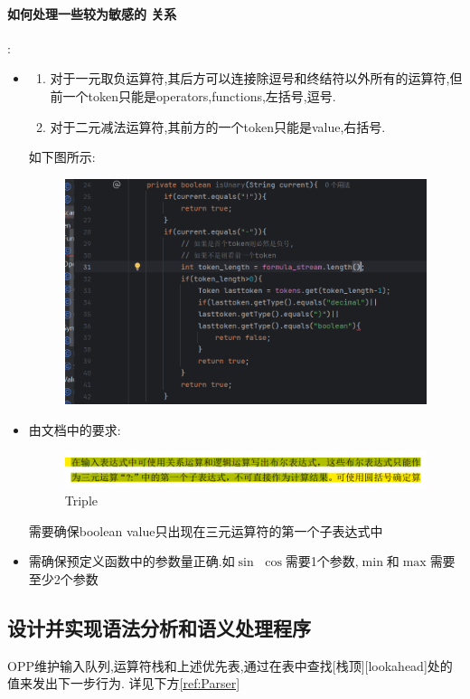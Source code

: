 \documentclass{article}
\begin{document}
\paragraph{如何处理一些较为敏感的 关系}:
\begin{itemize}
    \item {}
          \begin{enumerate}
              \item 对于一元取负运算符,其后方可以连接除逗号和终结符以外所有的运算符,但前一个token只能是operators,functions,左括号,逗号.
              \item 对于二元减法运算符,其前方的一个token只能是value,右括号.
          \end{enumerate}
          如下图所示:
          \begin{figure}[H]
              \centering
              \includegraphics[width=0.5\linewidth]{Unary.png}
              \caption{}
              \label{fig:Unary}
          \end{figure}

    \item {}
          由文档中的要求:
          \begin{figure}[H]
              \centering
              \includegraphics[width=0.5\linewidth]{15.png}
              \caption{Triple}
              \label{fig:enter-label}
          \end{figure}
          需要确保boolean value只出现在三元运算符的第一个子表达式中
    \item {}
          需确保预定义函数中的参数量正确.如$\sin$ $\cos$需要1个参数,$\min$和$\max
          $需要至少2个参数
\end{itemize}

\newpage
\subsection{设计并实现语法分析和语义处理程序}
OPP维护输入队列,运算符栈和上述优先表,通过在表中查找[栈顶][lookahead]处的值来发出下一步行为. 详见下方\ref{ref:Parser}
\end{document}
